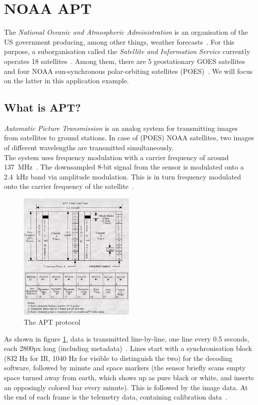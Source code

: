 \documentclass[conference]{IEEEtran}
\begin{document}
\section{NOAA APT} %
The \textit{National Oceanic and Atmospheric Administration} is an organisation of the US government producing, among other things, weather forecasts~\cite{NOAA19agency}. For this purpose, a suborganisation called the \textit{Satellite and Information Service} currently operates 18 satellites~\cite{NOAA19currently}. Among them, there are 5 geostationary GOES satellites and four NOAA sun-synchronous polar-orbiting satellites (POES)~\cite{NOAA19satellites}. We will focus on the latter in this application example.
\subsection{What is APT?}
\textit{Automatic Picture Transmission} is an analog system for transmitting images from satellites to ground stations. In case of (POES) NOAA satellites, two images of different wavelengths are transmitted simultaneously.\\
The system uses frequency modulation with a carrier frequency of around 137~MHz~\cite{NOAA19status}. The downsampled 8-bit signal from the sensor is modulated onto a 2.4~kHz band via amplitude modulation. This is in turn frequency modulated onto the carrier frequency of the satellite~\cite{NOAA19building}.\\
\begin{figure}
\centering
\caption{The APT protocol~\cite{NOAA19building}} \label{fig:aptprotocol}
\includegraphics[width=0.5\textwidth]{apt_protocol}
\end{figure}
As shown in figure \ref{fig:aptprotocol}, data is transmitted line-by-line, one line every 0.5 seconds, each 2800px long (including metadata)~\cite[2p]{dascal2012advanced}. Lines start with a synchronisation block (832 Hz for IR, 1040 Hz for visible to distinguish the two) for the decoding software, followed by minute and space markers (the sensor briefly scans empty space turned away from earth, which shows up as pure black or white, and inserts an opposingly colored bar every minute). This is followed by the image data. At the end of each frame is the telemetry data, containing calibration data~\cite[41pp]{NOAA19building}.
\end{document}

